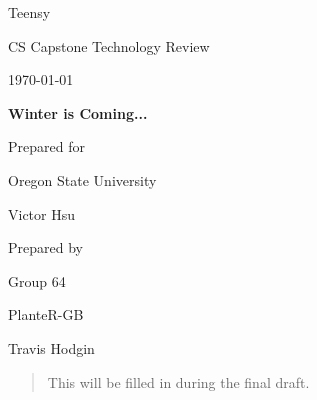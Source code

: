 Teensy\documentclass[onecolumn, draftclsnofoot,10pt, compsoc]{IEEEtran}
\def \CapstoneTeamName{			              			 PlanteR-GB}
\def \CapstoneTeamNumber{					           			 Group 64}
\def \GroupMemberOne{				           				Travis Hodgin}
\def \GroupMemberTwo{				           				Austin Hodgin}
\def \GroupMemberThree{			            Maximillian Schmidt}
\def\GroupMemberFour{		        	               Zach Lerew}
\def \CapstoneProjectName{	      	    Winter is Coming...}
\def \CapstoneSponsorCompany{		    Oregon State University}
\def \CapstoneSponsorPerson{		 			  				 Victor Hsu}
\def \DocType{		%
				Technology Review
				}
\newcommand{\NameSigPair}[1]{\par
\makebox[2.75in][r]{#1} \hfil 	\makebox[3.25in]{\makebox[2.25in]{\hrulefill} \hfill		\makebox[.75in]{\hrulefill}}
\par\vspace{-12pt} \textit{\tiny\noindent
\makebox[2.75in]{} \hfil		\makebox[3.25in]{\makebox[2.25in][r]{Signature} \hfill	\makebox[.75in][r]{Date}}}}
\renewcommand{\NameSigPair}[1]{#1}
\begin{document}
\begin{titlepage}
    \begin{singlespace}
        \hfill


        \par\vspace{.2in}
        \centering
        \scshape{
            \huge CS Capstone \DocType \par
            {\large\today}\par
            \vspace{.5in}
            \textbf{\Huge\CapstoneProjectName}\par

						\vspace{1in}

            {\large Prepared for}\par
            \Huge \CapstoneSponsorCompany\par
            \vspace{5pt}
            {\Large\NameSigPair{\CapstoneSponsorPerson}\par}

						\vspace{1in}

            {\large Prepared by}\par
						{\huge \CapstoneTeamNumber}\par
            \CapstoneTeamName\par
            \vspace{5pt}

            {
							\Large
							\NameSigPair{\GroupMemberOne}\par
            }

            \vspace{20pt}
        }
				\newpage
        \begin{abstract}
					This will be filled in during the final draft.
        \end{abstract}
    \end{singlespace}
\end{titlepage}
\end{document}
